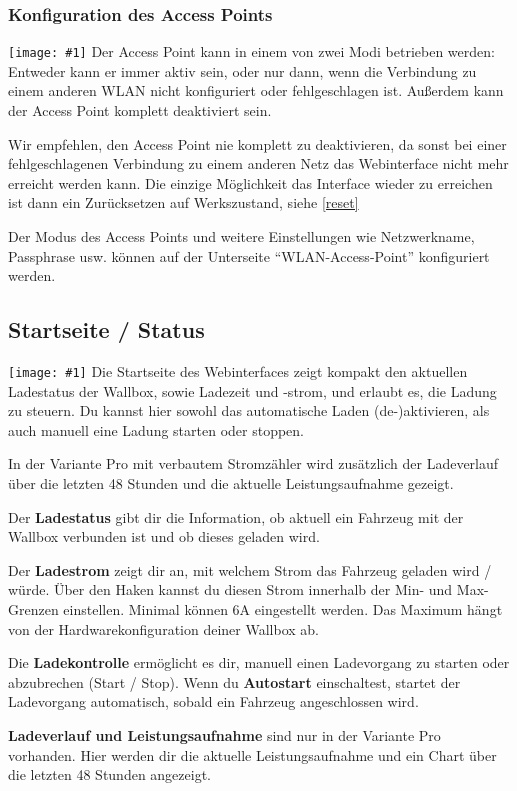\documentclass[a4paper,10pt]{article}
\newcommand{\hint}[1]{\begin{tcolorbox}[colback=boxgray,colframe=black,coltext=
white,title=Hinweis]#1\end{tcolorbox}}
\newcommand{\gfx}[1]{\texttt{[image: \#1]}}
\begin{document}
\begin{multicols*}{2}
	\subsubsection{Konfiguration des Access Points}
	\gfx{./img/resized/web_wifi_ap}
	Der Access Point kann in einem von zwei Modi betrieben werden: Entweder kann er immer aktiv sein,
	oder nur dann, wenn die Verbindung zu einem anderen WLAN nicht konfiguriert oder fehlgeschlagen ist.
	Außerdem kann der Access Point komplett deaktiviert sein.
	\hint{Wir empfehlen, den Access Point nie komplett zu deaktivieren, da sonst bei einer
		fehlgeschlagenen Verbindung zu einem anderen Netz das Webinterface nicht mehr erreicht
		werden kann. Die einzige Möglichkeit das Interface wieder zu erreichen ist dann ein Zurücksetzen auf Werkszustand, siehe \ref{reset}}
	Der Modus des Access Points und weitere Einstellungen wie Netzwerkname, Passphrase usw. können
	auf der Unterseite \enquote{WLAN-Access-Point} konfiguriert werden.

	\subsection{Startseite / Status}
	\gfx{./img/resized/web_status}
	Die Startseite des Webinterfaces zeigt kompakt den aktuellen Ladestatus der
	Wallbox, sowie Ladezeit und -strom, und erlaubt es, die Ladung zu steuern.
	Du kannst hier sowohl das automatische Laden (de-)aktivieren, als auch
	manuell eine Ladung starten oder stoppen.

	In der Variante Pro mit verbautem Stromzähler wird zusätzlich der Ladeverlauf
	über die letzten 48 Stunden und die aktuelle Leistungsaufnahme gezeigt.

	Der \textbf{Ladestatus} gibt dir die Information, ob aktuell ein
	Fahrzeug mit der Wallbox verbunden ist und ob dieses geladen wird.

	Der \textbf{Ladestrom} zeigt dir an, mit welchem Strom das Fahrzeug geladen
	wird / würde. Über den Haken kannst du diesen Strom innerhalb der Min-
	und Max-Grenzen einstellen. Minimal können 6A eingestellt werden. Das
	Maximum hängt von der Hardwarekonfiguration deiner Wallbox ab.

	Die \textbf{Ladekontrolle} ermöglicht es dir, manuell einen Ladevorgang zu
	starten oder abzubrechen (Start / Stop). Wenn du \textbf{Autostart}
	einschaltest, startet der Ladevorgang automatisch, sobald ein Fahrzeug
	angeschlossen wird.

	\textbf{Ladeverlauf und Leistungsaufnahme} sind nur in der Variante Pro
	vorhanden. Hier werden dir die aktuelle Leistungsaufnahme und ein Chart über
	die letzten 48 Stunden angezeigt.


\end{multicols*}
\end{document}
